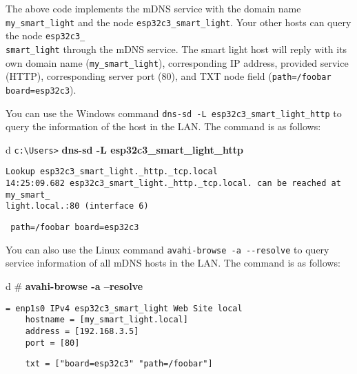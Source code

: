 \documentclass[a4paper,12pt]{book}
\begin{document}
The above code implements the mDNS service with the domain name \verb|my_smart_light| and the node \verb|esp32c3_smart_light|. Your other hosts can query the node \verb|esp32c3_|\\ \verb|smart_light| through the mDNS service. The smart light host will reply with its own domain name (\verb|my_smart_light|), corresponding IP address, provided service (HTTP), corresponding server port (80), and TXT node field (\verb|path=/foobar board=esp32c3|).


You can use the Windows command \verb|dns-sd -L esp32c3_smart_light_http| to query the information of the host in the LAN. The command is as follows:

\begin{codebloc}
\begin{tabular}{d}
\verb|c:\Users>| \textbf{dns-sd -L esp32c3\_smart\_light\_http}
\begin{verbatim}
Lookup esp32c3_smart_light._http._tcp.local
14:25:09.682 esp32c3_smart_light._http._tcp.local. can be reached at my_smart_
light.local.:80 (interface 6)
\end{verbatim}
\verb| path=/foobar board=esp32c3|
\end{tabular}
\end{codebloc}


You can also use the Linux command \verb|avahi-browse -a --resolve| to query service information of all mDNS hosts in the LAN. The command is as follows:

\begin{codebloc}
\begin{tabular}{d}
\# \textbf{avahi-browse -a --resolve}
\begin{verbatim}
= enp1s0 IPv4 esp32c3_smart_light Web Site local
    hostname = [my_smart_light.local]
    address = [192.168.3.5]
    port = [80]
\end{verbatim}
\verb|    txt = ["board=esp32c3" "path=/foobar"]|
\end{tabular}
\end{codebloc}
\end{document}
